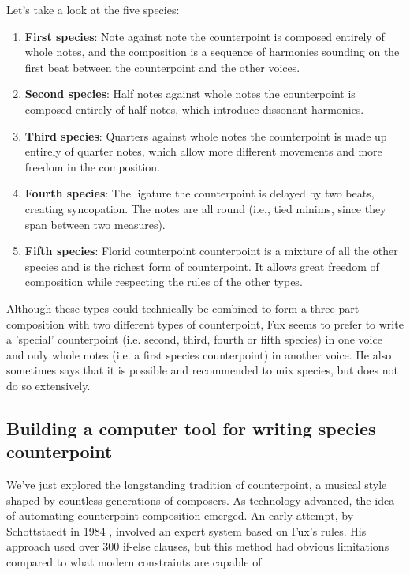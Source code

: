 Let's take a look at the five species:
\begin{enumerate}
    \item \textbf{First species}: Note against note \textendash{} the counterpoint is composed entirely of whole notes, and the composition is a sequence of harmonies sounding on the first beat between the counterpoint and the other voices.
    \item \textbf{Second species}: Half notes against whole notes \textendash{} the counterpoint is composed entirely of half notes, which introduce dissonant harmonies.
    \item \textbf{Third species}: Quarters against whole notes \textendash{} the counterpoint is made up entirely of quarter notes, which allow more different movements and more freedom in the composition.
    \item \textbf{Fourth species}: The ligature \textendash{} the counterpoint is delayed by two beats, creating syncopation. The notes are all round (i.e., tied minims, since they span between two measures).
    \item \textbf{Fifth species}: Florid counterpoint \textendash{} counterpoint is a mixture of all the other species and is the richest form of counterpoint. It allows great freedom of composition while respecting the rules of the other types.
\end{enumerate}

Although these types could technically be combined to form a three-part composition with two different types of counterpoint, Fux seems to prefer to write a 'special' counterpoint (i.e. second, third, fourth or fifth species) in one voice and only whole notes (i.e. a first species counterpoint) in another voice. He also sometimes says that it is possible and recommended to mix species, but does not do so extensively.

\subsection{Building a computer tool for writing species counterpoint}
We've just explored the longstanding tradition of counterpoint, a musical style shaped by countless generations of composers. As technology advanced, the idea of automating counterpoint composition emerged. An early attempt, by Schottstaedt in 1984 \cite{bill1984}, involved an expert system based on Fux's rules. His approach used over 300 if-else clauses, but this method had obvious limitations compared to what modern constraints are capable of.

